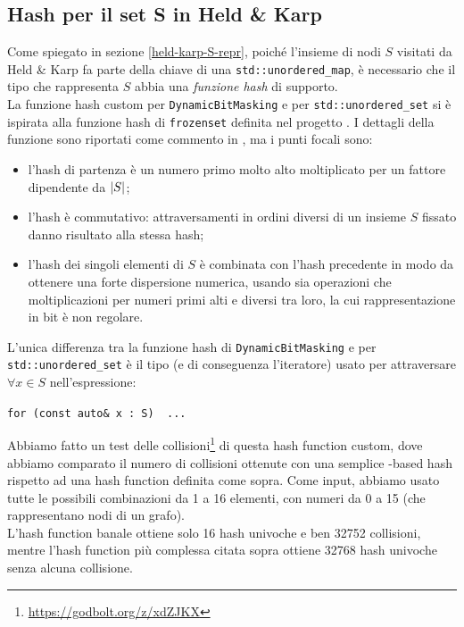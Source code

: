 \subsection{Hash per il set S in Held \& Karp}
\label{hashing}

Come spiegato in sezione \ref{held-karp-S-repr}, poiché l'insieme di nodi $S$ visitati da Held \& Karp fa parte della chiave di
una \texttt{std::unordered_map}, è necessario che il tipo che rappresenta $S$ abbia una \textit{funzione hash} di supporto. \\

\noindent La funzione hash custom per \texttt{DynamicBitMasking} e per \texttt{std::unordered_set} si è ispirata alla funzione hash di \texttt{frozenset} definita nel progetto .
I dettagli della funzione sono riportati come commento in , ma i punti focali sono:

\begin{itemize}
    \item l'hash di partenza è un numero primo molto alto moltiplicato per un fattore dipendente da $\abs{S}$;
    \item l'hash è commutativo: attraversamenti in ordini diversi di un insieme $S$ fissato danno risultato alla stessa hash;
    \item l'hash dei singoli elementi di $S$ è combinata con l'hash precedente in modo da ottenere una forte dispersione numerica, usando sia operazioni  che moltiplicazioni per numeri primi alti e diversi tra loro, la cui rappresentazione in bit è non regolare.
\end{itemize}

\noindent L'unica differenza tra la funzione hash di \texttt{DynamicBitMasking} e per \texttt{std::unordered_set} è il tipo (e di conseguenza l'iteratore)
usato per attraversare $\forall x \in S$ nell'espressione:

\begin{center}
    \texttt{for (const auto& x : S) { ... } }
\end{center}

\noindent Abbiamo fatto un test delle collisioni\footnote{\url{https://godbolt.org/z/xdZJKX}} di questa hash function custom, dove abbiamo comparato il numero di collisioni ottenute con una semplice -based hash
rispetto ad una hash function definita come sopra.
Come input, abbiamo usato tutte le possibili combinazioni da 1 a 16 elementi, con numeri da 0 a 15 (che rappresentano nodi di un grafo). \\

\noindent L'hash function banale ottiene solo 16 hash univoche e ben 32752 collisioni, mentre l'hash function più complessa citata sopra ottiene 32768
hash univoche senza alcuna collisione. \\

